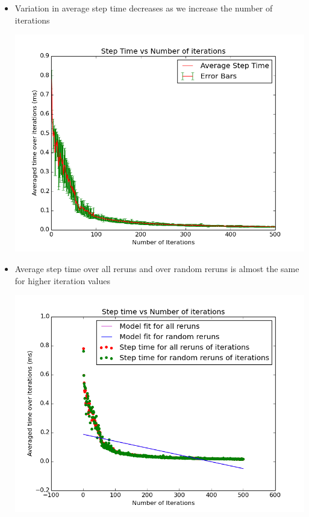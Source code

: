 \documentclass[11pt]{article}
\begin{document}
\begin{itemize}
\begin{center}
\end{center}
\item Variation in average step time decreases as we increase the number of iterations
\begin{center}
\includegraphics[scale=0.45]{./images/g13_plot03}
\end{center}
\item Average step time over all reruns and over random reruns is almost the same for higher iteration values
\begin{center}
\includegraphics[scale=0.45]{./images/g13_plot05}
\end{center}
\end{itemize}
 
\end{document}
